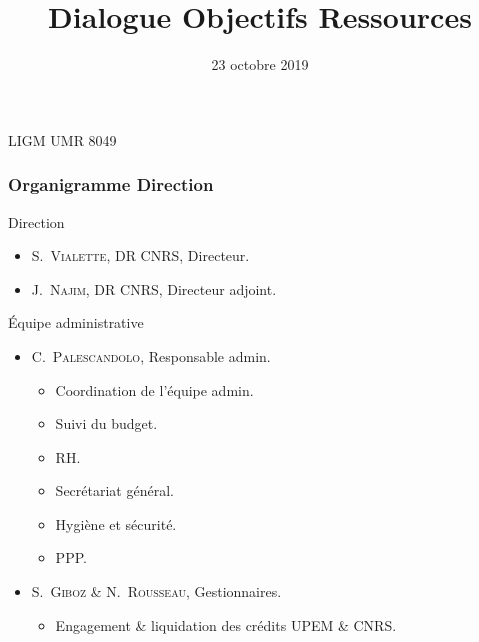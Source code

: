 \documentclass[]{beamer}
\title[DOR]{%
  \Large Dialogue Objectifs Ressources
}%
\institute[LIGM]{%
  \large {\bf Laboratoire d'Informatique Gaspard-Monge}
}
\date[23/10/19]{%
  23 octobre 2019
}%
\begin{document}

\begin{frame}
  \maketitle
\end{frame}


\begin{frame}[label=introduction, standout]{}
  LIGM UMR 8049
\end{frame}


\begin{frame}
  \frametitle{Organigramme Direction}

  \begin{block}{Direction}
    \begin{itemize}
      \item \textsc{S.~Vialette}, DR CNRS, Directeur.
      \item \textsc{J.~Najim}, DR CNRS, Directeur adjoint.
    \end{itemize}
  \end{block}

  \begin{block}{\'Equipe administrative}
    \begin{itemize}
      \item \textsc{C.~Palescandolo}, Responsable admin.
        \begin{itemize}
          \item Coordination de l'équipe admin.
          \item Suivi du budget.
          \item RH.
          \item Secrétariat général.
          \item Hygiène et sécurité.
          \item PPP.
        \end{itemize}

      \item \textsc{S.~Giboz} \& \textsc{N.~Rousseau}, Gestionnaires.
      \begin{itemize}
        \item Engagement \& liquidation des crédits UPEM \& CNRS.
      \end{itemize}
    \end{itemize}
  \end{block}

\end{frame}
\end{document}
